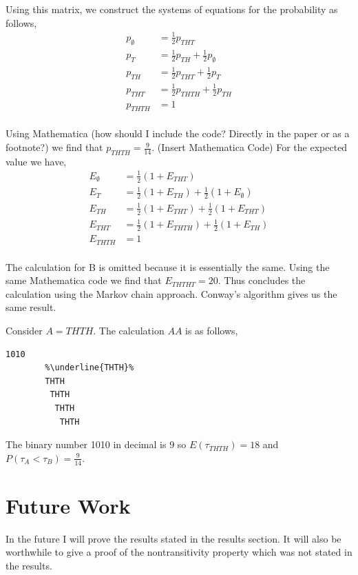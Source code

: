 \documentclass{article}
\numberwithin{mytheorem}{subsection} %
\begin{document}
		Using this matrix, we construct the systems of equations for the probability as follows,
		\begin{equation} 	
		\begin{split}
		p_{\emptyset} & = \frac{1}{2} p_{THT} \\
		p_{T} & = \frac{1}{2} p_{TH} + \frac{1}{2} p_{\emptyset} \\
		p_{TH} & = \frac{1}{2} p_{THT} + \frac{1}{2} p_T \\
		p_{THT} & = \frac{1}{2} p_{THTH} + \frac{1}{2} p_{TH} \\
		p_{THTH} & = 1 \\
		\end{split}
		\end{equation}

		Using Mathematica (how should I include the code? Directly in the paper or as a footnote?) we find that $p_{THTH} = \frac{9}{14}$. (Insert Mathematica Code) For the expected value we have,
		\begin{equation} 	
		\begin{split}
		E_{\emptyset} & = \frac{1}{2} (1 + E_{THT}) \\
		E_{T} & = \frac{1}{2} (1 + E_{TH}) + \frac{1}{2} (1 + E_{\emptyset}) \\
		E_{TH} & = \frac{1}{2} (1 + E_{THT}) + \frac{1}{2} (1 + E_{THT}) \\
		E_{THT} & = \frac{1}{2} (1 + E_{THTH}) + \frac{1}{2} (1 + E_{TH}) \\
		E_{THTH} & = 1 \\
		\end{split}
		\end{equation}

		The calculation for B is omitted because it is essentially the same. Using the same Mathematica code we find that $E_{THTHT} = 20$. Thus concludes the calculation using the Markov chain approach. Conway's algorithm gives us the same result. 

		Consider $A = THTH$. The calculation $AA$ is as follows,   
		\begin{lstlisting}[escapechar=\%]
		1010 
		%\underline{THTH}%
		THTH
		 THTH
		  THTH 
		   THTH 
		\end{lstlisting}

		The binary number 1010 in decimal is 9 so $E(\tau_{THTH}) = 18$ and $P(\tau_A < \tau_B) = \frac{9}{14}$.

	\section{Future Work}
		In the future I will prove the results stated in the results section. It will also be worthwhile to give a proof of the nontransitivity property which was not stated in the results.
\end{document}
